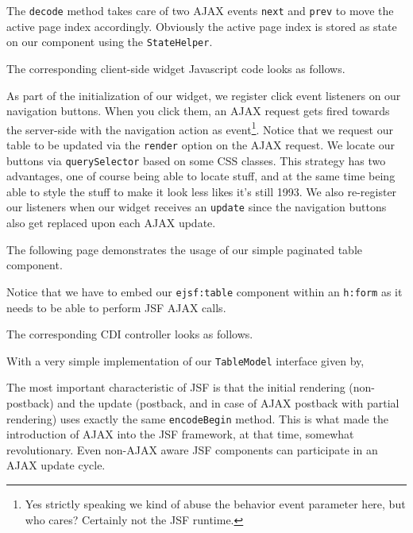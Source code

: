 The \texttt{decode} method takes care of two AJAX events \texttt{next} and \texttt{prev} to move the active page index accordingly.
Obviously the active page index is stored as state on our component using the \texttt{StateHelper}.

The corresponding client-side widget Javascript code looks as follows.

As part of the initialization of our widget, we register click event listeners on our navigation buttons.
When you click them, an AJAX request gets fired towards the server-side with the navigation action as event\footnote{Yes strictly speaking we kind of abuse the behavior event parameter here, but who cares? Certainly not the JSF runtime.}.
Notice that we request our table to be updated via the \texttt{render} option on the AJAX request.
We locate our buttons via \texttt{querySelector} based on some CSS classes.
This strategy has two advantages, one of course being able to locate stuff, and at the same time being able to style the stuff to make it look less likes it's still 1993.
We also re-register our listeners when our widget receives an \texttt{update} since the navigation buttons also get replaced upon each AJAX update.

The following page demonstrates the usage of our simple paginated table component.

Notice that we have to embed our \texttt{ejsf:table} component within an \texttt{h:form} as it needs to be able to perform JSF AJAX calls.

The corresponding CDI controller looks as follows.


With a very simple implementation of our \texttt{TableModel} interface given by,


The most important characteristic of JSF is that the initial rendering (non-postback) and the update (postback, and in case of AJAX postback with partial rendering) uses exactly the same \texttt{encodeBegin} method.
This is what made the introduction of AJAX into the JSF framework, at that time, somewhat revolutionary.
Even non-AJAX aware JSF components can participate in an AJAX update cycle.

